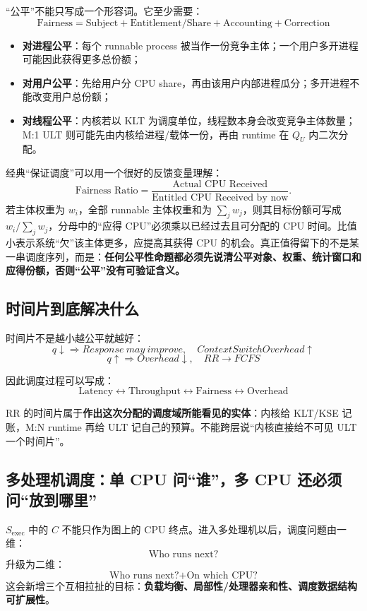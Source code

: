 \documentclass[11pt,a4paper]{ctexart}
\newcommand{\kw}[1]{\textbf{#1}}
\begin{document}
“公平”不能只写成一个形容词。它至少需要：
\[
\boxed{\text{Fairness}=\text{Subject}+\text{Entitlement/Share}+\text{Accounting}+\text{Correction}}
\]
\begin{itemize}
\item \kw{对进程公平}：每个 runnable process 被当作一份竞争主体；一个用户多开进程可能因此获得更多总份额；
\item \kw{对用户公平}：先给用户分 CPU share，再由该用户内部进程瓜分；多开进程不能改变用户总份额；
\item \kw{对线程公平}：内核若以 KLT 为调度单位，线程数本身会改变竞争主体数量；M:1 ULT 则可能先由内核给进程/载体一份，再由 runtime 在 $Q_U$ 内二次分配。
\end{itemize}

经典“保证调度”可以用一个很好的反馈变量理解：
\[
\text{Fairness Ratio}=\frac{\text{Actual CPU Received}}{\text{Entitled CPU Received by now}}.
\]
若主体权重为 $w_i$，全部 runnable 主体权重和为 $\sum_jw_j$，则其目标份额可写成 $w_i/\sum_jw_j$，分母中的“应得 CPU”必须乘以已经过去且可分配的 CPU 时间。比值小表示系统“欠”该主体更多，应提高其获得 CPU 的机会。真正值得留下的不是某一串调度序列，而是：\kw{任何公平性命题都必须先说清公平对象、权重、统计窗口和应得份额，否则“公平”没有可验证含义。}

\subsection{时间片到底解决什么}

时间片不是越小越公平就越好：
\[
q\downarrow\Rightarrow Response\ may\ improve,
\quad ContextSwitchOverhead\uparrow
\]
\[
q\uparrow\Rightarrow Overhead\downarrow,
\quad RR\rightarrow FCFS
\]

因此调度过程可以写成：
\[
\boxed{\text{Latency}\leftrightarrow\text{Throughput}\leftrightarrow\text{Fairness}\leftrightarrow\text{Overhead}}
\]

RR 的时间片属于\kw{作出这次分配的调度域所能看见的实体}：内核给 KLT/KSE 记账，M:N runtime 再给 ULT 记自己的预算。不能跨层说“内核直接给不可见 ULT 一个时间片”。

\subsection{多处理机调度：单 CPU 问“谁”，多 CPU 还必须问“放到哪里”}

$S_{\text{exec}}$ 中的 $C$ 不能只作为图上的 CPU 终点。进入多处理机以后，调度问题由一维：
\[
\boxed{\text{Who runs next?}}
\]
升级为二维：
\[
\boxed{\text{Who runs next?}+\text{On which CPU?}}
\]
这会新增三个互相拉扯的目标：\kw{负载均衡、局部性/处理器亲和性、调度数据结构可扩展性}。
\end{document}

